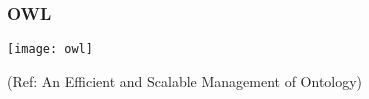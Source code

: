 \begin{frame}[fragile]\frametitle{OWL}

\begin{center}
\texttt{[image: owl]}

{\tiny (Ref: An Efficient and Scalable Management of Ontology)}
\end{center}	  

\end{frame}